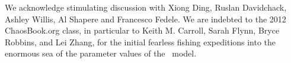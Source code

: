 \begin{acknowledgments}
We acknowledge stimulating discussion with
Xiong Ding,
Ruslan Davidchack,
Ashley Willis,
Al Shapere
and
Francesco Fedele.
We are indebted to the 2012 ChaosBook.org class, in particular to
Keith M. Carroll,
Sarah Flynn,
Bryce Robbins,
and
Lei Zhang,
for the initial fearless fishing expeditions into the enormous sea of the
parameter values of the \twoMode\ model.
\end{acknowledgments}

